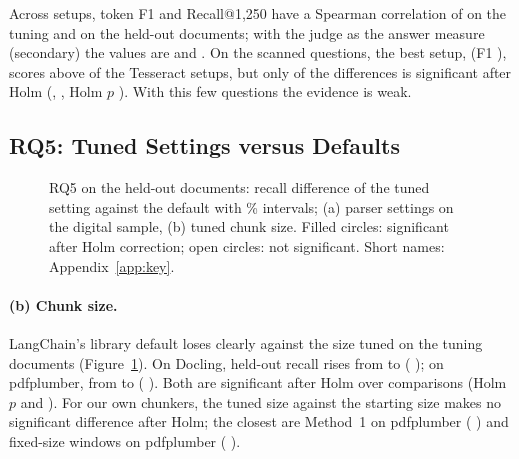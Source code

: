 Across setups, token F1 and Recall@1,250 have a Spearman correlation of
\RQfourSpearmanTuningFOne{} on the tuning and
\RQfourSpearmanHeldOutFOne{} on the held-out documents; with the judge
as the answer measure (secondary) the values are
\RQfourSpearmanTuningJudge{} and \RQfourSpearmanHeldOutJudge{}. On the
\AQScannedQuestions{} scanned questions, the best setup,
\RQfourScannedBest{} (F1 \RQfourScannedBestFOne{}), scores above
\RQfourScannedAboveDoclingOcrTesseract{} of the
\RQfourScannedCountDoclingOcrTesseract{} Tesseract setups, but only
\RQfourScannedSignificant{} of the \RQfourScannedComparisons{}
differences is significant after Holm (\RQfourScannedTopSetup{},
\RQfourScannedTopDiff{} \RQfourScannedTopCI{}, Holm $p$
\RQfourScannedTopHolm{}). With this few questions the evidence is weak.

\subsection{RQ5: Tuned Settings versus Defaults}
\label{sec:rq5}

\begin{figure}[t]
\centering
{}
\caption{RQ5 on the held-out documents: recall difference of the tuned setting against the default with \CILevel{}\% intervals; (a) parser settings on the digital sample, (b) tuned chunk size. Filled circles: significant after Holm correction; open circles: not significant. Short names: Appendix~\ref{app:key}.}
\label{fig:rq5}
\end{figure}

\paragraph{(b) Chunk size.} LangChain's library default loses clearly
against the size tuned on the tuning documents (Figure~\ref{fig:rq5}).
On Docling, held-out recall rises from
\RQfiveBLangchainRecursiveDoclingDefault{} to
\RQfiveBLangchainRecursiveDoclingTuned{}
(\RQfiveBLangchainRecursiveDoclingDiff{}
\RQfiveBLangchainRecursiveDoclingCI{}); on pdfplumber, from
\RQfiveBLangchainRecursivePdfplumberDefault{} to
\RQfiveBLangchainRecursivePdfplumberTuned{}
(\RQfiveBLangchainRecursivePdfplumberDiff{}
\RQfiveBLangchainRecursivePdfplumberCI{}). Both are significant after
Holm over \RQfiveBComparisons{} comparisons (Holm $p$
\RQfiveBLangchainRecursiveDoclingHolm{} and
\RQfiveBLangchainRecursivePdfplumberHolm{}). For our own chunkers, the
tuned size against the starting size makes no significant difference
after Holm; the closest are Method~1 on pdfplumber
(\RQfiveBMethodOneTreePdfplumberDiff{}
\RQfiveBMethodOneTreePdfplumberCI{}) and fixed-size windows on
pdfplumber (\RQfiveBFixedTokenPdfplumberDiff{}
\RQfiveBFixedTokenPdfplumberCI{}).

